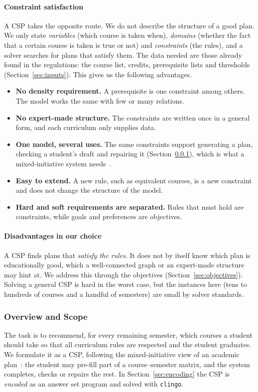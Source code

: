 \paragraph{Constraint satisfaction}
A CSP takes the opposite route. We do not describe the structure of a good plan. We only state \emph{variables} (which course is taken when), \emph{domains} (whether the fact that a certain course is taken is true or not) and \emph{constraints} (the rules), and a solver searches for plans that satisfy them. The data needed are those already found in the regulations: the course list, credits, prerequisite lists and thresholds (Section~\ref{sec:inputs}). This gives us the following advantages.
\begin{itemize}
      \item \textbf{No density requirement.} A prerequisite is one constraint among others. The model works the same with few or many relations.
      \item \textbf{No expert-made structure.} The constraints are written once in a general form, and each curriculum only supplies data.
      \item \textbf{One model, several uses.} The same constraints support generating a plan, checking a student's draft and repairing it (Section~\ref{sec:scope}), which is what a mixed-initiative system needs~\cite{wu-thesis}.
      \item \textbf{Easy to extend.} A new rule, such as equivalent courses, is a new constraint and does not change the structure of the model.
      \item \textbf{Hard and soft requirements are separated.} Rules that must hold are constraints, while goals and preferences are objectives.
\end{itemize}

\paragraph{Disadvantages in our choice}
A CSP finds plans that \emph{satisfy the rules}. It does not by itself know which plan is educationally good, which a well-connected graph or an expert-made structure may hint at. We address this through the objectives (Section~\ref{sec:objectives}). Solving a general CSP is hard in the worst
case, but the instances here (tens to hundreds of courses and a handful of semesters) are small by solver standards.


\subsubsection{Overview and Scope}\label{sec:scope}
The task is to recommend, for every remaining semester, which courses a student should take so that all curriculum rules are respected and the student graduates. We formulate it as a CSP, following the mixed-initiative view of an academic plan~\cite{wu-thesis}: the student may pre-fill part of
a course--semester matrix, and the system completes, checks or repairs the rest. In Section~\ref{sec:encoding} the CSP is \emph{encoded} as an answer set program and solved with \texttt{clingo}.

